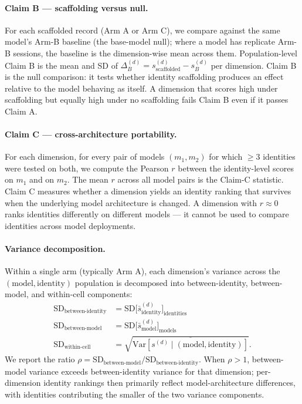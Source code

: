 \documentclass[11pt]{article}
\begin{document}
\paragraph{Claim B --- scaffolding versus null.}
For each scaffolded record (Arm A or Arm C), we compare against the same model's Arm-B baseline (the base-model null); where a model has replicate Arm-B sessions, the baseline is the dimension-wise mean across them. Population-level Claim B is the mean and SD of $\Delta_B^{(d)} = s_{\text{scaffolded}}^{(d)} - s_B^{(d)}$ per dimension. Claim B is the null comparison: it tests whether identity scaffolding produces an effect relative to the model behaving as itself. A dimension that scores high under scaffolding but equally high under no scaffolding fails Claim B even if it passes Claim A.

\paragraph{Claim C --- cross-architecture portability.}
For each dimension, for every pair of models $(m_1, m_2)$ for which $\geq 3$ identities were tested on both, we compute the Pearson $r$ between the identity-level scores on $m_1$ and on $m_2$. The mean $r$ across all model pairs is the Claim-C statistic. Claim C measures whether a dimension yields an identity ranking that survives when the underlying model architecture is changed. A dimension with $r \approx 0$ ranks identities differently on different models --- it cannot be used to compare identities across model deployments.

\paragraph{Variance decomposition.}
Within a single arm (typically Arm A), each dimension's variance across the $(\text{model}, \text{identity})$ population is decomposed into between-identity, between-model, and within-cell components:
\begin{align*}
    \text{SD}_{\text{between-identity}} &= \text{SD}\big[\bar{s}^{(d)}_\text{identity}\big]_{\text{identities}} \\
    \text{SD}_{\text{between-model}}    &= \text{SD}\big[\bar{s}^{(d)}_\text{model}\big]_{\text{models}} \\
    \text{SD}_{\text{within-cell}}      &= \sqrt{\overline{\text{Var}[s^{(d)} \mid (\text{model}, \text{identity})]}}.
\end{align*}
We report the ratio $\rho = \text{SD}_{\text{between-model}} / \text{SD}_{\text{between-identity}}$. When $\rho > 1$, between-model variance exceeds between-identity variance for that dimension; per-dimension identity rankings then primarily reflect model-architecture differences, with identities contributing the smaller of the two variance components.
\end{document}
